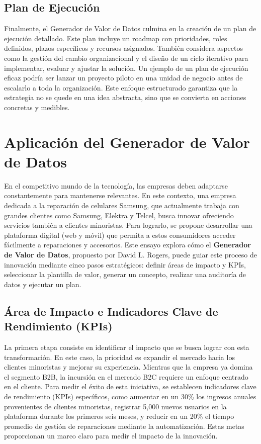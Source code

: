 	\subsection{Plan de Ejecución}

	Finalmente, el Generador de Valor de Datos culmina en la creación de un plan
	de ejecución detallado. Este plan incluye un roadmap con prioridades, roles
	definidos, plazos específicos y recursos asignados. También considera aspectos
	como la gestión del cambio organizacional y el diseño de un ciclo iterativo
	para implementar, evaluar y ajustar la solución. Un ejemplo de un plan de
	ejecución eficaz podría ser lanzar un proyecto piloto en una unidad de negocio
	antes de escalarlo a toda la organización. Este enfoque estructurado garantiza
	que la estrategia no se quede en una idea abstracta, sino que se convierta en
	acciones concretas y medibles.

	\clearpage
	\section{Aplicación del Generador de Valor de Datos}

	En el competitivo mundo de la tecnología, las empresas deben adaptarse
	constantemente para mantenerse relevantes. En este contexto, una empresa
	dedicada a la reparación de celulares Samsung, que actualmente trabaja con grandes
	clientes como Samsung, Elektra y Telcel, busca innovar ofreciendo servicios también
	a clientes minoristas. Para lograrlo, se propone desarrollar una plataforma digital
	(web y móvil) que permita a estos consumidores acceder fácilmente a reparaciones
	y accesorios. Este ensayo explora cómo el \textbf{Generador de Valor de Datos},
	propuesto por David L. Rogers, puede guiar este proceso de innovación mediante
	cinco pasos estratégicos: definir áreas de impacto y KPIs, seleccionar la
	plantilla de valor, generar un concepto, realizar una auditoría de datos y
	ejecutar un plan.

	\subsection{Área de Impacto e Indicadores Clave de Rendimiento (KPIs)}

	La primera etapa consiste en identificar el impacto que se busca lograr con esta
	transformación. En este caso, la prioridad es expandir el mercado hacia los clientes
	minoristas y mejorar su experiencia. Mientras que la empresa ya domina el
	segmento B2B, la incursión en el mercado B2C requiere un enfoque centrado en el
	cliente. Para medir el éxito de esta iniciativa, se establecen indicadores clave
	de rendimiento (KPIs) específicos, como aumentar en un 30\% los ingresos anuales
	provenientes de clientes minoristas, registrar 5,000 nuevos usuarios en la
	plataforma durante los primeros seis meses, y reducir en un 20\% el tiempo
	promedio de gestión de reparaciones mediante la automatización. Estas metas proporcionan
	un marco claro para medir el impacto de la innovación.

